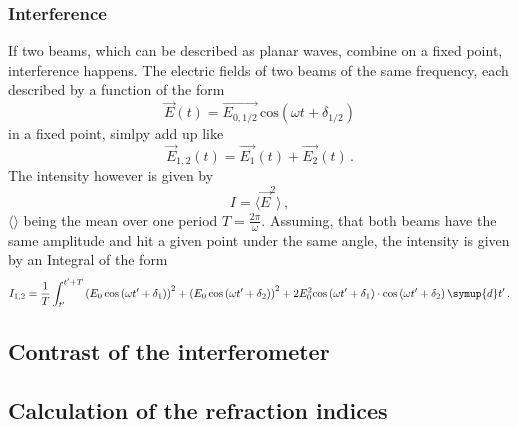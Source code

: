\subsubsection{Interference}
If two beams, which can be described as planar waves, combine on a fixed point, interference happens. The electric fields of two beams of the same frequency, each described by a function of the form 
\begin{equation}
    \vec{E}\left( t\right) = \vec{E_{0,1/2}} \, \text{cos} \left(\omega t + \delta_{1/2}\right)
\end{equation}
in a fixed point, simlpy add up like
\begin{equation}
    \vec{E}_{1,2}\left( t\right) = \vec{E_{1}}\left( t\right) + \vec{E_{2}}\left( t\right) \, .
\end{equation}
The intensity however is given by 
\begin{equation}
    I = \langle \vec{E}^2 \rangle \, ,
\end{equation}
$\langle \rangle$ being the mean over one period $T = \frac{2 \pi}{\omega}$. Assuming, that both beams have the same amplitude and hit a given point under the same angle, the intensity is given by an Integral of the form
\begin{equation}
    I_{1,2} = \frac{1}{T} \int_{t'}^{t' + T} \left( E_0 \, \text{cos}\left( \omega t' + \delta_1 \right) \right)^2 + \left( E_0 \, \text{cos}\left( \omega t' + \delta_2 \right) \right)^2 + 2 E_0^2 \text{cos}\left( \omega t' + \delta_1 \right) \cdot \text{cos}\left( \omega t' + \delta_2 \right) \symup{d}t' \, . 
\end{equation}

\subsection{Contrast of the interferometer}
\subsection{Calculation of the refraction indices}
\cite{sample}

\newpage
